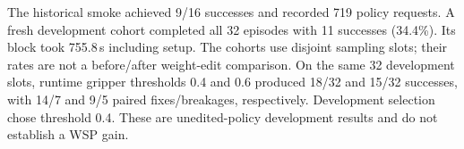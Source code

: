 The historical smoke achieved 9/16 successes and recorded 719 policy requests. A fresh development cohort completed all 32 episodes with 11 successes (34.4\%). Its block took 755.8\,s including setup. The cohorts use disjoint sampling slots; their rates are not a before/after weight-edit comparison. On the same 32 development slots, runtime gripper thresholds 0.4 and 0.6 produced 18/32 and 15/32 successes, with 14/7 and 9/5 paired fixes/breakages, respectively. Development selection chose threshold 0.4. These are unedited-policy development results and do not establish a WSP gain.
